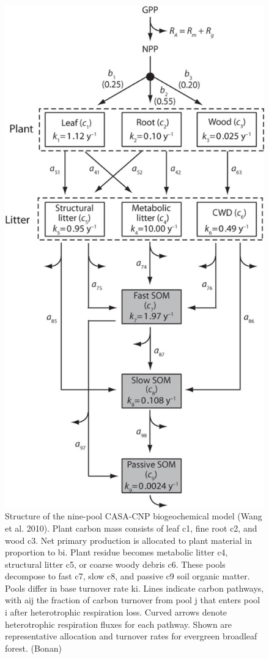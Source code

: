 \documentclass[
  12pt,
  oneside]{book}
\begin{document}
\begin{figure}

{\centering \includegraphics[width=0.8\linewidth]{figures/chap5/f54_casa_cnp} 

}

\caption{Structure of the nine-pool CASA-CNP biogeochemical model (Wang et al. 2010). Plant carbon mass consists of leaf c1, fine root c2, and wood c3. Net primary production is allocated to plant material in proportion to bi. Plant residue becomes metabolic litter c4, structural litter c5, or coarse woody debris c6. These pools decompose to fast c7, slow c8, and passive c9 soil organic matter. Pools differ in base turnover rate ki. Lines indicate carbon pathways, with aij the fraction of carbon turnover from pool j that enters pool i after heterotrophic respiration loss. Curved arrows denote heterotrophic respiration fluxes for each pathway. Shown are representative allocation and turnover rates for evergreen broadleaf forest. (Bonan)}\label{fig:f54}
\end{figure}
\end{document}
